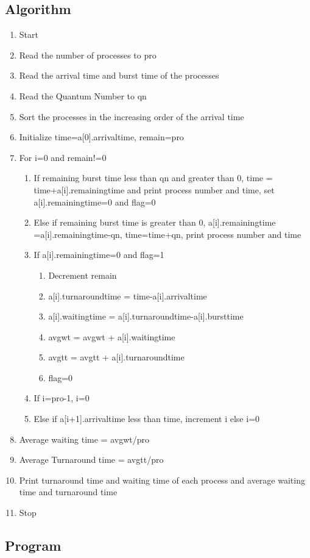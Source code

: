 \documentclass[a4paper]{article}
\begin{document}
\subsection{Algorithm}
\begin{enumerate}
\item Start
\item Read the number of processes to pro
\item Read the arrival time and burst time of the processes
\item Read the Quantum Number to qn
\item Sort the processes in the increasing order of the arrival time
\item Initialize time=a[0].arrivaltime, remain=pro
\item For i=0 and remain!=0
\begin{enumerate}
\item If remaining burst time less than qn and greater than 0, time = time+a[i].remainingtime and print process number and time, set a[i].remainingtime=0 and flag=0
\item Else if remaining burst time is greater than 0, a[i].remainingtime =a[i].remainingtime-qn, time=time+qn, print process number and time
\item If a[i].remainingtime=0 and flag=1
\begin{enumerate}
\item Decrement remain
\item a[i].turnaroundtime = time-a[i].arrivaltime
\item a[i].waitingtime = a[i].turnaroundtime-a[i].bursttime
\item avgwt = avgwt + a[i].waitingtime
\item avgtt = avgtt + a[i].turnaroundtime
\item flag=0
\end{enumerate}
\item If i=pro-1, i=0
\item Else if a[i+1].arrivaltime less than time, increment i else i=0 
\end{enumerate}
\item Average waiting time = avgwt/pro
\item Average Turnaround time = avgtt/pro
\item Print turnaround time and waiting time of each process and average waiting time and turnaround time
\item Stop
\end{enumerate}
\subsection{Program}

\\
\\
\end{document}
